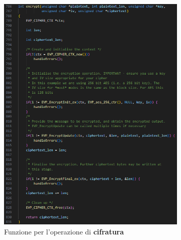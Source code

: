 \begin{figure}[h]
    \begin{subfigure}{0.45\textwidth}
        \includegraphics[width=1\textwidth]{capitoli/figure-implementazione/aes-encrypt.png}
        \caption{Funzione per l'operazione di \textbf{cifratura}}
        \label{fig:aes-encrypt}
    \end{subfigure}
    \begin{subfigure}{0.45\textwidth}

\end{subfigure}
\end{figure}
